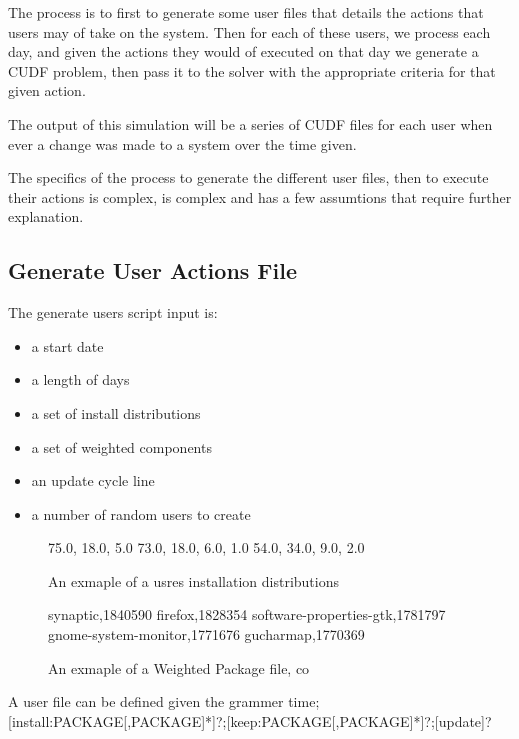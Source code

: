The process is to first to generate some user files that details the actions that users may of take on the system.
Then for each of these users, we process each day, and given the actions they would of executed on that day we generate a CUDF problem,
then pass it to the solver with the appropriate criteria for that given action.

The output of this simulation will be a series of CUDF files for each user when ever a change was made to a system over the time given.

The specifics of the process to generate the different user files, then to execute their actions is complex, is complex and 
has a few assumtions that require further explanation.

\subsection{Generate User Actions File}
The generate users script input is:
\begin{itemize}
  \item a start date 
  \item a length of days 
  \item a set of install distributions
  \item a set of weighted components 
  \item an update cycle line 
  \item a number of random users to create
\end{itemize}

\begin{figure}[htp]
\begin{center}
75.0, 18.0, 5.0
73.0, 18.0, 6.0, 1.0
54.0, 34.0, 9.0, 2.0
\caption[Install Distribution Example File]{An exmaple of a usres installation distributions}
\label{userfile}
\end{center}
\end{figure}

\begin{figure}[htp]
\begin{center}
synaptic,1840590
firefox,1828354
software-properties-gtk,1781797
gnome-system-monitor,1771676
gucharmap,1770369
\caption[Weighted Package File Example]{An exmaple of a Weighted Package file, co }
\label{userfile}
\end{center}
\end{figure}

A user file can be defined given the grammer
time;[install:PACKAGE[,PACKAGE]*]?;[keep:PACKAGE[,PACKAGE]*]?;[update]?

